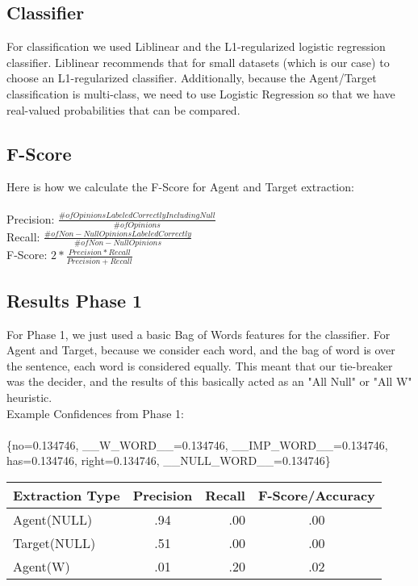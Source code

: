 \documentclass{article}
\begin{document}
      \subsection{Classifier}
For classification we used Liblinear and the L1-regularized logistic regression classifier. Liblinear recommends that for small datasets (which is our case) to choose an L1-regularized classifier. Additionally, because the Agent/Target classification is multi-class, we need to use Logistic Regression so that we have real-valued probabilities that can be compared. 

\newpage

	\subsection{F-Score}
	
	Here is how we calculate the F-Score for Agent and Target extraction:\\\\
	
	Precision: $ \frac{\# of Opinions Labeled Correctly Including Null}{\# of Opinions}$\\
	
	Recall: $ \frac{\# of Non-Null Opinions Labeled Correctly}{\# of Non-Null Opinions}$\\
	
	F-Score: $ 2 * \frac{Precision * Recall}{Precision + Recall}$
           
	\subsection{Results Phase 1}
	
	For Phase 1, we just used a basic Bag of Words features for the classifier. For Agent and Target, because we consider each word, and the bag of word is over the sentence, each word is considered equally. This meant that our tie-breaker was the decider, and the results of this basically acted as an "All Null" or "All W" heuristic. \\
	
\noindent Example Confidences from Phase 1: \\\\
\{no=0.134746, \_\_W\_WORD\_\_=0.134746, \_\_IMP\_WORD\_\_=0.134746, has=0.134746, right=0.134746, \_\_NULL\_WORD\_\_=0.134746\}

\begin{center} 

        \begin{tabular}{ | l | c | r | c}
            \hline
            Extraction Type & Precision & Recall & F-Score/Accuracy \\ \hline
            Agent(NULL) & .94 & .00 & .00\\ \hline
            Target(NULL) & .51 & .00 & .00\\ \hline
            Agent(W) & .01 & .20 & .02\\ \hline
        \end{tabular}
    \end{center}
            
\end{document}
